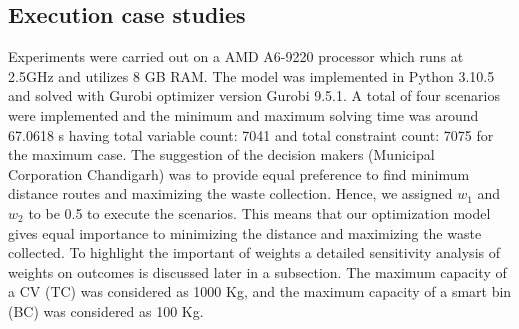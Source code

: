 \documentclass[12pt]{article}
\begin{document}
\subsection{Execution case studies}
Experiments were carried out on a AMD A6-9220 processor which runs at 2.5GHz and utilizes 8 GB RAM. The model was implemented in Python 3.10.5 and solved with Gurobi optimizer version Gurobi 9.5.1. A total of four scenarios were implemented and the minimum and maximum solving time was around 67.0618 s having total variable count: 7041 and total constraint count: 7075 for the maximum case.
The suggestion of the decision makers (Municipal Corporation Chandigarh) was to provide equal preference to find minimum distance routes and maximizing the waste collection. Hence, we assigned  $w_1$ and $w_2$ to be 0.5 to execute the scenarios. This means that our optimization model gives equal importance to minimizing the distance and maximizing the waste collected. To highlight the important of weights a detailed sensitivity analysis of weights on outcomes is discussed later in a subsection. The maximum capacity of a CV (TC) was considered as 1000 Kg, and the maximum capacity of a smart bin (BC) was considered as 100 Kg.
\end{document}
